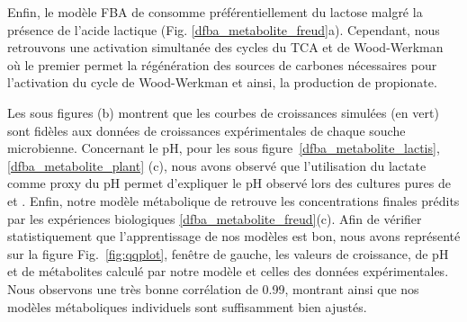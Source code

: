 \documentclass[../main.tex]{subfiles}
\begin{document}
Enfin, le modèle FBA de \freud consomme préférentiellement du lactose malgré la présence de l'acide lactique (Fig. \ref{dfba_metabolite_freud}a). Cependant, nous retrouvons une activation simultanée des cycles du TCA et de Wood-Werkman \citep{Deborde2000} où le premier permet la régénération des sources de carbones nécessaires pour l'activation du cycle de Wood-Werkman et ainsi, la production de propionate.


Les sous figures (b) montrent que les courbes de croissances simulées (en vert) sont fidèles aux données de croissances expérimentales de chaque souche microbienne. Concernant le pH, pour les sous figure~\ref{dfba_metabolite_lactis}, \ref{dfba_metabolite_plant} (c), nous avons observé que l'utilisation du lactate comme proxy du pH permet d'expliquer le pH observé lors des cultures pures de \lactis et \plantarum. Enfin, notre modèle métabolique de \freud retrouve les concentrations finales prédits par les expériences biologiques \ref{dfba_metabolite_freud}(c). Afin de vérifier statistiquement que l'apprentissage de nos modèles est bon, nous avons représenté sur la figure Fig.~\ref{fig:qqplot}, fenêtre de gauche, les valeurs de croissance, de pH et de métabolites calculé par notre modèle et celles des données expérimentales. Nous observons une très bonne corrélation de 0.99, montrant ainsi que nos modèles métaboliques individuels sont suffisamment bien ajustés. \\
\end{document}
